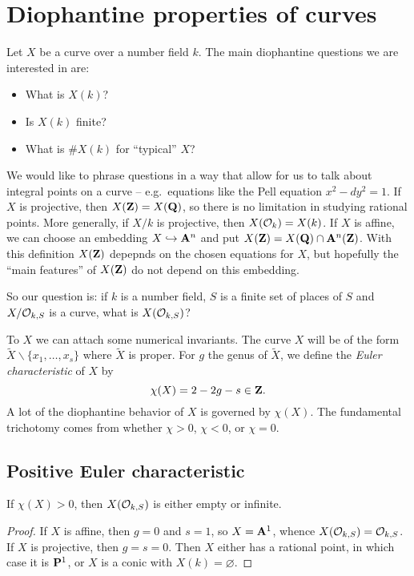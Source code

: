 
\section{Diophantine properties of curves}





Let $X$ be a curve over a number field $k$. The main diophantine questions we 
are interested in are: 
\begin{itemize}
  \item What is $X(k)$?
  \item Is $X(k)$ finite?
  \item What is $\# X(k)$ for ``typical'' $X$?
\end{itemize}
We would like to phrase questions in a way that allow for us to talk about 
integral points on a curve -- e.g.~equations like the Pell equation 
$x^2-d y^2=1$. If $X$ is projective, then $X(\mathbf{Z})=X(\mathbf{Q})$, so there is no 
limitation in studying rational points. More generally, if $X/k$ is 
projective, then $X(\mathcal{O}_k)=X(k)$. If $X$ is affine, we can choose an 
embedding $X\hookrightarrow \mathbf{A}^n$ and put $X(\mathbf{Z})=X(\mathbf{Q})\cap \mathbf{A}^n(\mathbf{Z})$. 
With this definition $X(\mathbf{Z})$ depepnds on the chosen equations for $X$, but 
hopefully the ``main features'' of $X(\mathbf{Z})$ do not depend on this embedding. 

So our question is: if $k$ is a number field, $S$ is a finite set of places of 
$S$ and $X/\mathcal{O}_{k,S}$ is a curve, what is $X(\mathcal{O}_{k,S})$? 

To $X$ we can attach some numerical invariants. The curve $X$ will be of the 
form $\widetilde X\smallsetminus \{x_1,\dots,x_s\}$ where $\widetilde X$ is 
proper. For $g$ the genus of $\widetilde X$, we define the 
\emph{Euler characteristic} of $X$ by 
\[
  \chi(X) = 2 - 2 g - s\in \mathbf{Z} .
\]
A lot of the diophantine behavior of $X$ is governed by $\chi(X)$. The 
fundamental trichotomy comes from whether $\chi>0$, $\chi<0$, or 
$\chi=0$. 





\subsection{Positive Euler characteristic}

\begin{theo}
If $\chi(X)>0$, then $X(\mathcal{O}_{k,S})$ is either empty or infinite. 
\end{theo}
\begin{proof}
If $X$ is affine, then $g=0$ and $s=1$, so $X=\mathbf{A}^1$, whence 
$X(\mathcal{O}_{k,S}) = \mathcal{O}_{k,S}$. If $X$ is projective, then $g=s=0$. Then $X$ 
either has a rational point, in which case it is $\mathbf{P}^1$, or $X$ is a conic 
with $X(k)=\varnothing$. 
\end{proof}

